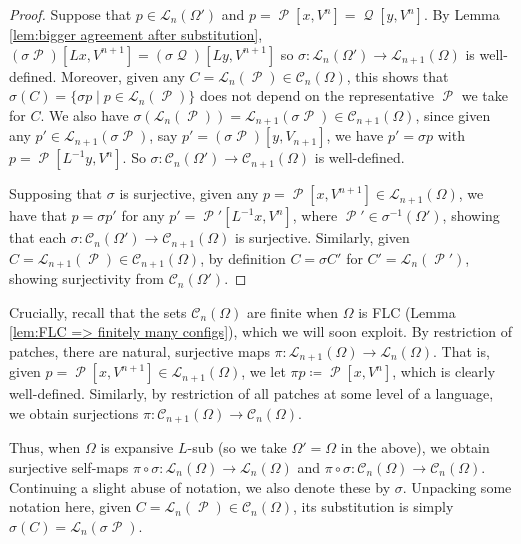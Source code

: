 \documentclass[11pt]{amsart}
\numberwithin{equation}{section}
\theoremstyle{plain}
\theoremstyle{definition}
\newcommand{\sub}{\sigma}
\DeclareMathOperator{\cP}{\mathcal{P}}
\DeclareMathOperator{\cQ}{\mathcal{Q}}
\newcommand{\lang}{\mathscr{L}}
\begin{document}
\begin{proof}
Suppose that \(p \in \lang_n(\Omega')\) and \(p = \cP[x,V^n] = \cQ[y,V^n]\). By Lemma \ref{lem:bigger agreement after substitution}, \((\sub \cP)[Lx,V^{n+1}] = (\sub \cQ)[Ly,V^{n+1}]\) so \(\sub \colon \lang_n(\Omega') \to \lang_{n+1}(\Omega)\) is well-defined. Moreover, given any \(C = \lang_n(\cP) \in \mathscr{C}_n(\Omega)\), this shows that \(\sub(C) = \{\sub p \mid p \in \lang_n(\cP)\}\) does not depend on the representative \(\cP\) we take for \(C\). We also have \(\sub(\lang_n(\cP)) = \lang_{n+1}(\sub \cP) \in \mathscr{C}_{n+1}(\Omega)\), since given any \(p' \in \lang_{n+1}(\sub \cP)\), say \(p' = (\sub \cP)[y,V_{n+1}]\), we have \(p' = \sub p\) with \(p = \cP[L^{-1} y, V^n]\). So \(\sub \colon \mathscr{C}_n(\Omega') \to \mathscr{C}_{n+1}(\Omega)\) is well-defined.

Supposing that \(\sub\) is surjective, given any \(p = \cP[x,V^{n+1}] \in \lang_{n+1}(\Omega)\), we have that \(p = \sub p'\) for any \(p' = \cP'[L^{-1}x,V^n]\), where \(\cP' \in \sub^{-1}(\Omega')\), showing that each \(\sub \colon \mathscr{C}_n(\Omega') \to \mathscr{C}_{n+1}(\Omega)\) is surjective. Similarly, given \(C = \lang_{n+1}(\cP) \in \mathscr{C}_{n+1}(\Omega)\), by definition \(C = \sub C'\) for \(C' = \lang_n(\cP')\), showing surjectivity from \(\mathscr{C}_n(\Omega')\).
\end{proof}

Crucially, recall that the sets \(\mathscr{C}_n(\Omega)\) are finite when \(\Omega\) is FLC (Lemma \ref{lem:FLC => finitely many configs}), which we will soon exploit. By restriction of patches, there are natural, surjective maps \(\pi \colon \lang_{n+1}(\Omega) \to \lang_n(\Omega)\). That is, given \(p = \cP[x,V^{n+1}] \in \lang_{n+1}(\Omega)\), we let \(\pi p \coloneqq \cP[x,V^n]\), which is clearly well-defined. Similarly, by restriction of all patches at some level of a language, we obtain surjections \(\pi \colon \mathscr{C}_{n+1}(\Omega) \to \mathscr{C}_n(\Omega)\).

Thus, when \(\Omega\) is expansive \(L\)-sub (so we take \(\Omega' = \Omega\) in the above), we obtain surjective self-maps \(\pi \circ \sub \colon \lang_n(\Omega) \to \lang_n(\Omega)\) and \(\pi \circ \sub \colon \mathscr{C}_n(\Omega) \to \mathscr{C}_n(\Omega)\). Continuing a slight abuse of notation, we also denote these by \(\sub\). Unpacking some notation here, given \(C = \lang_n(\cP) \in \mathscr{C}_n(\Omega)\), its substitution is simply \(\sub(C) = \lang_n(\sub \cP)\).
\end{document}
